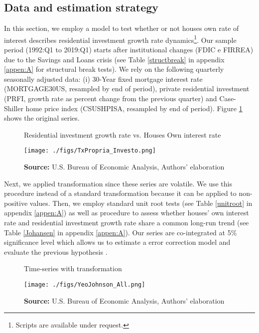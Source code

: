 \documentclass[12pt, a4paper]{article}
\begin{document}
\subsection{Data and estimation strategy}
\label{sec:org9f2318c}
\label{sec:estimation}


In this section, we employ a model to test whether or not houses own rate of interest describes residential investment growth rate dynamics\footnote{Scripts are available under request.}.
Our sample period (1992:Q1 to 2019:Q1) starts after institutional changes (FDIC e
FIRREA) due to the Savings and Loans crisis (see Table \ref{structbreak} in appendix \ref{appen:A} for structural break tests).
We rely on the following  quarterly seasonally adjusted data: (i) 30-Year fixed mortgage interest rate (MORTGAGE30US, resampled by end of period), private residential investment (PRFI, growth rate as percent change from the previous quarter) and Case-Shiller home price index
(CSUSHPISA, resampled by end of period). Figure \ref{propria_investo}  shows the original series.

\begin{figure}[htb]
	\centering
	\caption{Residential investment growth rate vs. Houses Own interest rate}
	\label{propria_investo}
	\texttt{[image: ./figs/TxPropria\_Investo.png]}
	\caption*{\textbf{Source:} U.S. Bureau of Economic Analysis, Authors' elaboration}
\end{figure}


Next, we applied \textcite{yeo_new_2000} transformation since these series are volatile. We use this procedure instead of a standard \textcite{box_analysis_1964} transformation  because it can be applied to non-positive values.
Then, we employ standard unit root tests (see Table \ref{unitroot} in appendix \ref{appen:A}) as well as \textcite{johansen_estimation_1991} procedure to assess whether houses' own interest rate and residential investment growth rate share a common long-run trend (see Table \ref{Johansen} in appendix \ref{appen:A}).
Our series are co-integrated at 5\% significance level which allows us to estimate a error correction model and evaluate the previous hypothesis \cite{enders_applied_2014}.

\begin{figure}[htb]
	\centering
	\caption{Time-series with \textcite{yeo_new_2000} transformation}
	\label{YeoJhonson}
	\texttt{[image: ./figs/YeoJohnson\_All.png]}
	\caption*{\textbf{Source:} U.S. Bureau of Economic Analysis, Authors' elaboration}
\end{figure}
\end{document}
